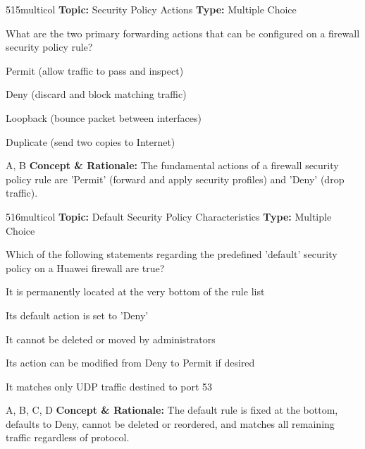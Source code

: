\begin{qcard}{515}{multicol}
\textcolor{darkslate!75}{\small\textbf{Topic:} Security Policy Actions \hfill \textbf{Type:} Multiple Choice}\vspace{0.4em}\par
What are the two primary forwarding actions that can be configured on a firewall security policy rule?
\begin{qoptions}
\item Permit (allow traffic to pass and inspect)
\item Deny (discard and block matching traffic)
\item Loopback (bounce packet between interfaces)
\item Duplicate (send two copies to Internet)
\end{qoptions}
\end{qcard}
\nopagebreak
\begin{explainbox}{A, B}
\textbf{Concept \& Rationale:} The fundamental actions of a firewall security policy rule are 'Permit' (forward and apply security profiles) and 'Deny' (drop traffic).
\end{explainbox}

\begin{qcard}{516}{multicol}
\textcolor{darkslate!75}{\small\textbf{Topic:} Default Security Policy Characteristics \hfill \textbf{Type:} Multiple Choice}\vspace{0.4em}\par
Which of the following statements regarding the predefined 'default' security policy on a Huawei firewall are true?
\begin{qoptions}
\item It is permanently located at the very bottom of the rule list
\item Its default action is set to 'Deny'
\item It cannot be deleted or moved by administrators
\item Its action can be modified from Deny to Permit if desired
\item It matches only UDP traffic destined to port 53
\end{qoptions}
\end{qcard}
\nopagebreak
\begin{explainbox}{A, B, C, D}
\textbf{Concept \& Rationale:} The default rule is fixed at the bottom, defaults to Deny, cannot be deleted or reordered, and matches all remaining traffic regardless of protocol.
\end{explainbox}

